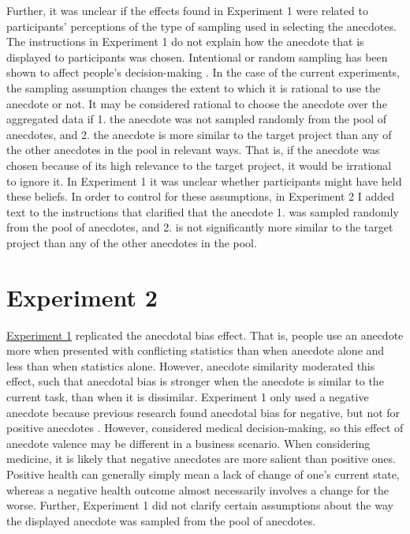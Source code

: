 \documentclass[a4paper, nobind, dvipsnames]{templates/ociamthesis}
\theoremstyle{definition}
\theoremstyle{definition}
\theoremstyle{definition}
\theoremstyle{definition}
\theoremstyle{remark}
\begin{document}
Further, it was unclear if the effects found in Experiment 1 were related to
participants' perceptions of the type of sampling used in selecting the
anecdotes. The instructions in Experiment 1 do not explain how the anecdote that
is displayed to participants was chosen. Intentional or random sampling has been
shown to affect people's decision-making \autocite[e.g.,][]{hayes2019}. In the case of the
current experiments, the sampling assumption changes the extent to which it is
rational to use the anecdote or not. It may be considered rational to choose the
anecdote over the aggregated data if 1. the anecdote was not sampled randomly
from the pool of anecdotes, and 2. the anecdote is more similar to the target
project than any of the other anecdotes in the pool in relevant ways. That is,
if the anecdote was chosen because of its high relevance to the target project,
it would be irrational to ignore it. In Experiment 1 it was unclear whether
participants might have held these beliefs. In order to control for these
assumptions, in Experiment 2 I added text to the instructions that clarified
that the anecdote 1. was sampled randomly from the pool of anecdotes, and 2. is
not significantly more similar to the target project than any of the other
anecdotes in the pool.

\hypertarget{anecdotes-2}{%
\section{Experiment 2}\label{anecdotes-2}}

\protect\hyperlink{anecdotes-1}{Experiment 1} replicated the anecdotal bias effect. That is,
people use an anecdote more when presented with conflicting statistics than when
anecdote alone and less than when statistics alone. However, anecdote similarity
moderated this effect, such that anecdotal bias is stronger when the anecdote is
similar to the current task, than when it is dissimilar. Experiment 1 only used
a negative anecdote because previous research found anecdotal bias for negative,
but not for positive anecdotes \autocite{jaramillo2019}. However, \textcite{jaramillo2019}
considered medical decision-making, so this effect of anecdote valence may be
different in a business scenario. When considering medicine, it is likely that
negative anecdotes are more salient than positive ones. Positive health can
generally simply mean a lack of change of one's current state, whereas a
negative health outcome almost necessarily involves a change for the worse.
Further, Experiment 1 did not clarify certain assumptions about the way the
displayed anecdote was sampled from the pool of anecdotes.
\end{document}
